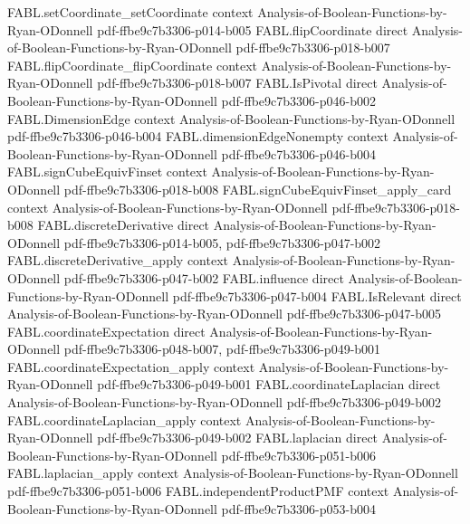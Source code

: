 \begin{theorem}
  {FABL.setCoordinate_setCoordinate}
  {context}
  {Analysis-of-Boolean-Functions-by-Ryan-ODonnell}
  {pdf-ffbe9c7b3306-p014-b005}
\proofstep
  {FABL.flipCoordinate}
  {direct}
  {Analysis-of-Boolean-Functions-by-Ryan-ODonnell}
  {pdf-ffbe9c7b3306-p018-b007}
\proofstep
  {FABL.flipCoordinate_flipCoordinate}
  {context}
  {Analysis-of-Boolean-Functions-by-Ryan-ODonnell}
  {pdf-ffbe9c7b3306-p018-b007}
\proofstep
  {FABL.IsPivotal}
  {direct}
  {Analysis-of-Boolean-Functions-by-Ryan-ODonnell}
  {pdf-ffbe9c7b3306-p046-b002}
\proofstep
  {FABL.DimensionEdge}
  {context}
  {Analysis-of-Boolean-Functions-by-Ryan-ODonnell}
  {pdf-ffbe9c7b3306-p046-b004}
\proofstep
  {FABL.dimensionEdgeNonempty}
  {context}
  {Analysis-of-Boolean-Functions-by-Ryan-ODonnell}
  {pdf-ffbe9c7b3306-p046-b004}
\proofstep
  {FABL.signCubeEquivFinset}
  {context}
  {Analysis-of-Boolean-Functions-by-Ryan-ODonnell}
  {pdf-ffbe9c7b3306-p018-b008}
\proofstep
  {FABL.signCubeEquivFinset_apply_card}
  {context}
  {Analysis-of-Boolean-Functions-by-Ryan-ODonnell}
  {pdf-ffbe9c7b3306-p018-b008}
\proofstep
  {FABL.discreteDerivative}
  {direct}
  {Analysis-of-Boolean-Functions-by-Ryan-ODonnell}
  {pdf-ffbe9c7b3306-p014-b005,
    pdf-ffbe9c7b3306-p047-b002}
\proofstep
  {FABL.discreteDerivative_apply}
  {context}
  {Analysis-of-Boolean-Functions-by-Ryan-ODonnell}
  {pdf-ffbe9c7b3306-p047-b002}
\proofstep
  {FABL.influence}
  {direct}
  {Analysis-of-Boolean-Functions-by-Ryan-ODonnell}
  {pdf-ffbe9c7b3306-p047-b004}
\proofstep
  {FABL.IsRelevant}
  {direct}
  {Analysis-of-Boolean-Functions-by-Ryan-ODonnell}
  {pdf-ffbe9c7b3306-p047-b005}
\proofstep
  {FABL.coordinateExpectation}
  {direct}
  {Analysis-of-Boolean-Functions-by-Ryan-ODonnell}
  {pdf-ffbe9c7b3306-p048-b007,
    pdf-ffbe9c7b3306-p049-b001}
\proofstep
  {FABL.coordinateExpectation_apply}
  {context}
  {Analysis-of-Boolean-Functions-by-Ryan-ODonnell}
  {pdf-ffbe9c7b3306-p049-b001}
\proofstep
  {FABL.coordinateLaplacian}
  {direct}
  {Analysis-of-Boolean-Functions-by-Ryan-ODonnell}
  {pdf-ffbe9c7b3306-p049-b002}
\proofstep
  {FABL.coordinateLaplacian_apply}
  {context}
  {Analysis-of-Boolean-Functions-by-Ryan-ODonnell}
  {pdf-ffbe9c7b3306-p049-b002}
\proofstep
  {FABL.laplacian}
  {direct}
  {Analysis-of-Boolean-Functions-by-Ryan-ODonnell}
  {pdf-ffbe9c7b3306-p051-b006}
\proofstep
  {FABL.laplacian_apply}
  {context}
  {Analysis-of-Boolean-Functions-by-Ryan-ODonnell}
  {pdf-ffbe9c7b3306-p051-b006}
\proofstep
  {FABL.independentProductPMF}
  {context}
  {Analysis-of-Boolean-Functions-by-Ryan-ODonnell}
  {pdf-ffbe9c7b3306-p053-b004}
\proofstep

\end{theorem}
